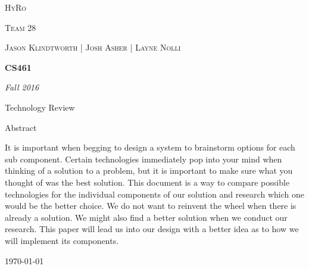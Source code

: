 \documentclass[10pt,draftclsnofoot,onecolumn]{IEEEtran}
\begin{document}
\begin{titlepage}
\centering
	{\scshape\LARGE HyRo \par}
	{\scshape\LARGE Team 28\par}
	\vspace{1cm}
	{\scshape\Large Jason Klindtworth  |  Josh Asher  |   Layne Nolli}
	\noindent\makebox[\linewidth]{\rule{17cm}{2pt}}
	\vspace{1cm}
	{\huge\bfseries CS461\par}
	\vspace{2cm}
	{\Large\itshape Fall 2016\par}
	\vspace{4cm}
	{\large Technology Review\par}
	\vspace{4cm}
	{\large Abstract\par}
	\vspace{1cm}
It is important when begging to design a system to brainstorm options for each sub component. Certain technologies immediately pop into your mind when thinking of a solution to a problem, but it is important to make sure what you thought of was the best solution. This document is a way to compare possible technologies for the individual components of our solution and research which one would be the better choice. We do not want to reinvent the wheel when there is already a solution. We might also find a better solution when we conduct our research. This paper will lead us into our design with a better idea as to how we will implement its components.\\
	\noindent\makebox[\linewidth]{\rule{17cm}{2pt}}

	\vfill

	{\large \today\par}
\end{titlepage}
\tableofcontents
\end{document}
